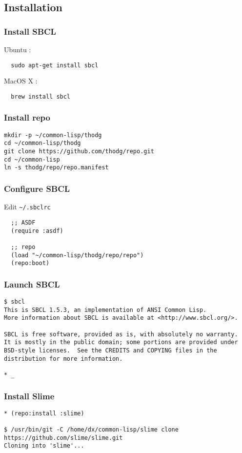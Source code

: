 \documentclass[8pt]{beamer}
\begin{document}
\subsection{Installation}

\begin{frame}[fragile]
  \frametitle{Install SBCL}
  Ubuntu :
\begin{verbatim}
  sudo apt-get install sbcl
\end{verbatim}
  MacOS X :
\begin{verbatim}
  brew install sbcl
\end{verbatim}
\end{frame}

\begin{frame}[fragile]
  \frametitle{Install repo}
\begin{verbatim}
mkdir -p ~/common-lisp/thodg
cd ~/common-lisp/thodg
git clone https://github.com/thodg/repo.git
cd ~/common-lisp
ln -s thodg/repo/repo.manifest
\end{verbatim}
\end{frame}

\begin{frame}[fragile]
  \frametitle{Configure SBCL}
  Edit \tt{\textasciitilde/.sbclrc}
\begin{verbatim}
  ;; ASDF
  (require :asdf)

  ;; repo
  (load "~/common-lisp/thodg/repo/repo")
  (repo:boot)
\end{verbatim}
\end{frame}

\begin{frame}[fragile]
  \frametitle{Launch SBCL}
\begin{verbatim}
$ sbcl
This is SBCL 1.5.3, an implementation of ANSI Common Lisp.
More information about SBCL is available at <http://www.sbcl.org/>.

SBCL is free software, provided as is, with absolutely no warranty.
It is mostly in the public domain; some portions are provided under
BSD-style licenses.  See the CREDITS and COPYING files in the
distribution for more information.

* _
\end{verbatim}
\end{frame}

\begin{frame}[fragile]
  \frametitle{Install Slime}
\begin{verbatim}
* (repo:install :slime)

$ /usr/bin/git -C /home/dx/common-lisp/slime clone https://github.com/slime/slime.git
Cloning into 'slime'...
\end{verbatim}
\end{frame}
\end{document}
